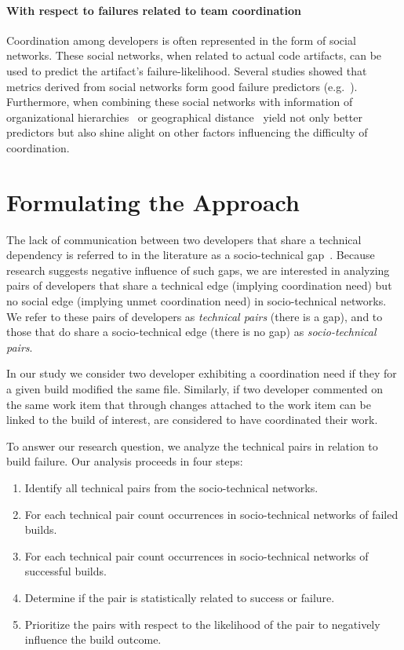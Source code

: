 \documentclass[conference]{IEEEtran}
\begin{document}
\paragraph{With respect to failures related to team coordination}
Coordination among developers is often represented in the form of social networks.
These social networks, when related to actual code artifacts, can be used to predict the artifact's failure-likelihood.
Several studies showed that metrics derived from social networks form good failure predictors (e.g.~\cite{meneely:fse:2008}).
Furthermore, when combining these social networks with information of organizational hierarchies~\cite{nagappan:icse:2008} or geographical distance~\cite{bird:acm:2009} yield not only better predictors but also shine alight on other factors influencing the difficulty of coordination.




\section{Formulating the Approach}
The lack of communication between two developers that share a
technical dependency is referred to in the literature as a
socio-technical gap~\cite{valetto:msr:2007}. Because research suggests negative influence of such gaps, we are interested in analyzing pairs of developers that share a technical edge (implying coordination need) but no social edge (implying
unmet coordination need) in socio-technical networks. We refer to these pairs of
developers as \emph{technical pairs} (there is a gap), and to those that do
share a socio-technical edge (there is no gap) as \emph{socio-technical pairs}. 

In our study we consider two developer exhibiting a coordination need if they for a given build modified the same file.
Similarly, if two developer commented on the same work item that through changes attached to the work item can be linked to the build of interest, are considered to have coordinated their work.

To answer our research question, we analyze the
technical pairs in relation to build
failure. Our analysis proceeds in four steps:

\begin{enumerate}
\item Identify all technical pairs from the socio-technical networks.
\item For each technical pair count occurrences in socio-technical networks of
failed builds.
\item For each technical pair count occurrences in socio-technical networks of
successful builds.
\item Determine if the pair is statistically related to success or failure.
\item Prioritize the pairs with respect to the likelihood of the pair to negatively influence the build outcome.
\end{enumerate}
\end{document}
